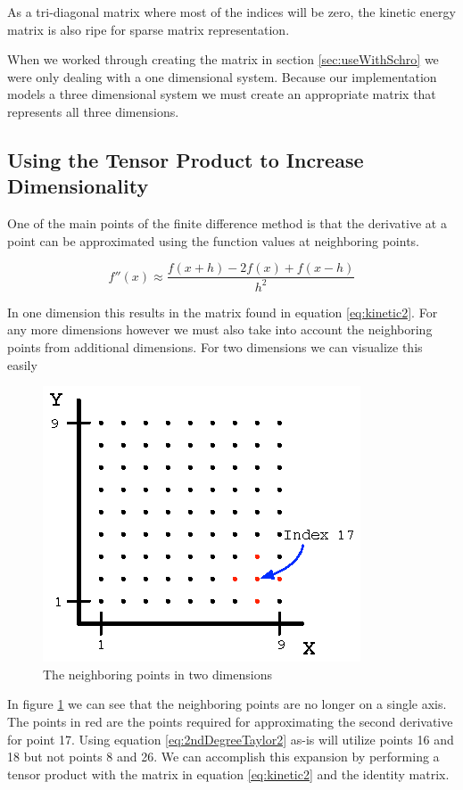 \documentclass[authoryearcitations]{UoYCSproject}
\begin{document}
As a tri-diagonal matrix where most of the indices will be zero, the kinetic energy matrix is also ripe for sparse
matrix representation. 

When we worked through creating the matrix in section \ref{sec:useWithSchro} we were only dealing with a one dimensional
system. Because our implementation models a three dimensional system we must create an appropriate matrix that represents
all three dimensions. 


\subsection{Using the Tensor Product to Increase Dimensionality}
One of the main points of the finite difference method is that the derivative at a point can be approximated
using the function values at neighboring points.

\begin{equation}
f''(x) \approx \frac{f(x + h) - 2f(x) + f(x - h)}{h^2}
\label{eq:2ndDegreeTaylor2}
\end{equation}

In one dimension this results in the matrix found in equation \ref{eq:kinetic2}. For any more dimensions however
we must also take into account the neighboring points from additional dimensions. For two dimensions we can visualize
this easily

\begin{figure}
\centering
  \includegraphics[scale=1.2]{figures/finite2D.eps}
  \caption{The neighboring points in two dimensions}
\label{fig:finite2D}
\end{figure}

In figure \ref{fig:finite2D} we can see that the neighboring points are no longer on a single axis. The points in red
are the points required for approximating the second derivative for point 17. Using equation \ref{eq:2ndDegreeTaylor2} as-is
will utilize points 16 and 18 but not points 8 and 26. We can accomplish this expansion by performing a tensor product
with the matrix in equation \ref{eq:kinetic2} and the identity matrix. 
\end{document}
